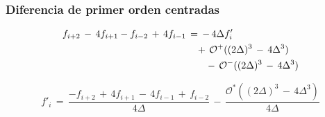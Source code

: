 \documentclass[9pt,technote,twoside,letterpaper,onecolumn]{IEEEtran}
\begin{document}
\subsubsection{Diferencia de primer orden centradas}
\label{sec:dif1D2Oc}
\begin{align}
  f_{i+2}\,-\,4f_{i+1}-f_{i-2}\,+\,4f_{i-1}&\,=\,-\,4\Delta f'_i\notag\\
  &\quad+\,\mathcal{O}^+((2\Delta)^3\,-\,4\Delta^3)\notag\\
  &\qquad-\,\mathcal{O}^-((2\Delta)^3\,-\,4\Delta^3)\notag
\end{align}

\begin{equation}
  f'_i\,=\,\frac{-f_{i+2}\,+\,4f_{i+1}\,-\,4f_{i-1}\,+\,f_{i-2}}{4\Delta}\,-\,\frac{\mathcal{O}^*((2\Delta)^3\,-\,4\Delta^3)}{4\Delta}
  \label{eq:2ordC}
\end{equation}
\end{document}
